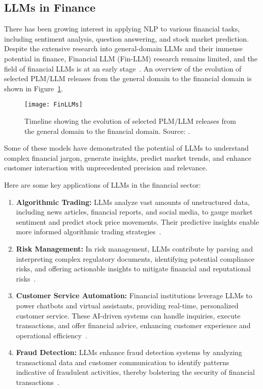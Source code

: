 \subsection{LLMs in Finance}
\label{subsec:llms-in-finance}

There has been growing interest in applying NLP to various financial tasks, including sentiment analysis, question answering, and stock market prediction.
Despite the extensive research into general-domain LLMs and their immense potential in finance, Financial LLM (Fin-LLM) research remains limited, and the field of financial LLMs is at an early stage~\cite{lee2024survey}.
An overview of the evolution of selected PLM/LLM releases from the general domain to the financial domain is shown in Figure~\ref{fig:llm-finance}.

\begin{figure}[h]
	\centering
	\texttt{[image: FinLLMs]}
	\caption{Timeline showing the evolution of selected PLM/LLM releases from the general domain to the financial domain. Source: \protect\textcite{lee2024survey}.}
	\label{fig:llm-finance}
\end{figure}

Some of these models have demonstrated the potential of LLMs to understand complex financial jargon, generate insights, predict market trends, and enhance customer interaction with unprecedented precision and relevance.

Here are some key applications of LLMs in the financial sector:

\begin{enumerate}
	\item \textbf{Algorithmic Trading:}
	      {LLMs analyze vast amounts of unstructured data, including news articles, financial reports, and social media, to gauge market sentiment and predict stock price movements.
		      Their predictive insights enable more informed algorithmic trading strategies~\cite{buehler2018deep}.}

	\item \textbf{Risk Management:}
	      {In risk management, LLMs contribute by parsing and interpreting complex regulatory documents, identifying potential compliance risks, and offering actionable insights to mitigate financial and reputational risks~\cite{li2020natural}.}

	\item \textbf{Customer Service Automation:}
	      {Financial institutions leverage LLMs to power chatbots and virtual assistants, providing real-time, personalized customer service. These AI-driven systems can handle inquiries, execute transactions, and offer financial advice, enhancing customer experience and operational efficiency~\cite{pal2021enhancing}.}

	\item \textbf{Fraud Detection:}
	      {LLMs enhance fraud detection systems by analyzing transactional data and customer communication to identify patterns indicative of fraudulent activities, thereby bolstering the security of financial transactions~\cite{smith2019improving}.}
\end{enumerate}

